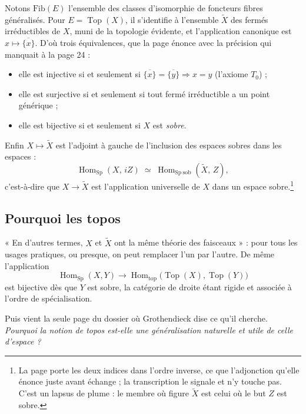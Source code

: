 \documentclass[11pt,a4paper]{article}
\begin{document}
Notons $\mathrm{Fib}(E)$ l'ensemble des
classes d'isomorphie de foncteurs fibres généralisés. Pour
$E = \operatorname{Top}(X)$, il s'identifie à l'ensemble $\widetilde{X}$ des
fermés irréductibles de $X$, muni de la topologie évidente, et l'application
canonique est $x \mapsto \overline{\{x\}}$. D'où trois équivalences, que la page
énonce avec la précision qui manquait à la page 24 :

\begin{itemize}
\item elle est injective si et seulement si $\overline{\{x\}} =
\overline{\{y\}} \Rightarrow x = y$ (l'axiome $T_{0}$) ;
\item elle est surjective si et seulement si tout fermé irréductible a un point
générique ;
\item elle est bijective si et seulement si $X$ est \emph{sobre}.
\end{itemize}

Enfin $X \mapsto \widetilde{X}$ est l'adjoint à gauche de l'inclusion des
espaces sobres dans les espaces :
\[
\operatorname{Hom}_{\mathrm{Sp}}(X,\, i Z) \;\simeq\;
\operatorname{Hom}_{\mathrm{Sp\ sob}}(\widetilde{X},\, Z),
\]
c'est-à-dire que $X \to \widetilde{X}$ est l'application universelle de $X$
dans un espace sobre.\footnote{La page porte les deux indices dans l'ordre
inverse, ce que l'adjonction qu'elle énonce juste avant échange ; la
transcription le signale et n'y touche pas. C'est un lapsus de plume : le
membre où figure $\widetilde{X}$ est celui où le but $Z$ est sobre.}

\subsection*{Pourquoi les topos}

« En d'autres termes, $X$ et $\widetilde{X}$ ont la même théorie des
faisceaux » : pour tous les usages pratiques, ou presque, on peut remplacer
l'un par l'autre. De même l'application
\[
\operatorname{Hom}_{\mathrm{Sp}}(X, Y) \longrightarrow
\operatorname{Hom}_{\mathrm{top}}\bigl(\operatorname{Top}(X),
\operatorname{Top}(Y)\bigr)
\]
est bijective dès que $Y$ est sobre, la catégorie de droite étant rigide et
associée à l'ordre de spécialisation.

Puis vient la seule page du dossier où Grothendieck dise ce qu'il cherche. \emph{Pourquoi la notion de topos est-elle
une généralisation naturelle et utile de celle d'espace ?}
\end{document}
